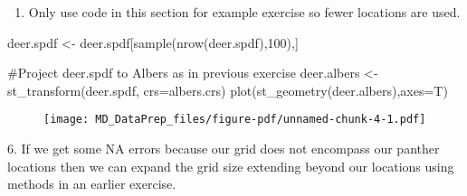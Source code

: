 \documentclass[
  letterpaper,
]{book}
\newenvironment{Shaded}{\begin{snugshade}}{\end{snugshade}}
\newcommand{\AttributeTok}[1]{\textcolor[rgb]{0.40,0.45,0.13}{#1}}
\newcommand{\CommentTok}[1]{\textcolor[rgb]{0.37,0.37,0.37}{#1}}
\newcommand{\DecValTok}[1]{\textcolor[rgb]{0.68,0.00,0.00}{#1}}
\newcommand{\FunctionTok}[1]{\textcolor[rgb]{0.28,0.35,0.67}{#1}}
\newcommand{\NormalTok}[1]{\textcolor[rgb]{0.00,0.23,0.31}{#1}}
\newcommand{\OtherTok}[1]{\textcolor[rgb]{0.00,0.23,0.31}{#1}}
\providecommand{\tightlist}{%
  \setlength{\itemsep}{0pt}\setlength{\parskip}{0pt}}\usepackage{longtable,booktabs,array}
\begin{document}
\begin{enumerate}
\def\labelenumi{\arabic{enumi}.}
\setcounter{enumi}{4}
\tightlist
\item
  Only use code in this section for example exercise so fewer locations
  are used.
\end{enumerate}

\begin{Shaded}
\begin{Highlighting}[]
\NormalTok{deer.spdf }\OtherTok{\textless{}{-}}\NormalTok{ deer.spdf[}\FunctionTok{sample}\NormalTok{(}\FunctionTok{nrow}\NormalTok{(deer.spdf),}\DecValTok{100}\NormalTok{),]}

\CommentTok{\#Project deer.spdf to Albers as in previous exercise}
\NormalTok{deer.albers }\OtherTok{\textless{}{-}}\FunctionTok{st\_transform}\NormalTok{(deer.spdf, }\AttributeTok{crs=}\NormalTok{albers.crs)}
\FunctionTok{plot}\NormalTok{(}\FunctionTok{st\_geometry}\NormalTok{(deer.albers),}\AttributeTok{axes=}\NormalTok{T)}
\end{Highlighting}
\end{Shaded}

\begin{figure}[H]

{\centering \texttt{[image: MD\_DataPrep\_files/figure-pdf/unnamed-chunk-4-1.pdf]}

}

\end{figure}

6. If we get some NA errors because our grid does not encompass our
panther locations then we can expand the grid size extending beyond our
locations using methods in an earlier exercise.
\end{document}
